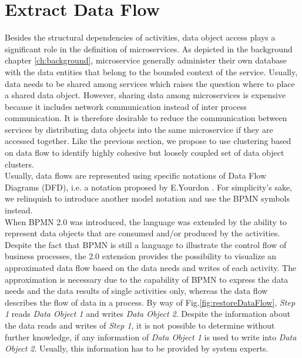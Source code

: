 \section{Extract Data Flow}
\label{sec:Solution:ExtractDataFlow}
Besides the structural dependencies of activities, data object access plays a significant role in the definition of microservices. As depicted in the background chapter \ref{ch:background}, microservice generally administer their own database with the data entities that belong to the bounded context of the service. Usually, data needs to be shared among services which raises the question where to place a shared data object. However, sharing data among microservices is expensive because it includes network communication instead of inter process communication. It is therefore desirable to reduce the communication between services by distributing data objects into the same microservice if they are accessed together.  
Like the previous section, we propose to use clustering based on data flow to identify highly cohesive but loosely coupled set of data object clusters. \\
Usually, data flows are represented using specific notations of Data Flow Diagrams (DFD), i.e. a notation proposed by E.Yourdon \cite{YourdonDFD}. For simplicity's sake, we relinquish to introduce another model notation and use the BPMN symbols instead. \\
When BPMN 2.0 was introduced, the language was extended by the ability to represent data objects that are consumed and/or produced by the activities. Despite the fact that BPMN is still a language to illustrate the control flow of business processes, the 2.0 extension provides the possibility to visualize an approximated data flow based on the data needs and writes of each activity. The approximation is necessary due to the capability of BPMN to express the data needs and the data results of single activities only, whereas the data flow describes the flow of data in a process. By way of Fig.\ref{fig:restoreDataFlow}, \textit{Step 1} reads \textit{Data Object 1} and writes \textit{Data Object 2}. Despite the information about the data reads and writes of \textit{Step 1}, it is not possible to determine without further knowledge, if any information of \textit{Data Object 1} is used to write into \textit{Data Object 2}. Usually, this information has to be provided by system experts. \\

